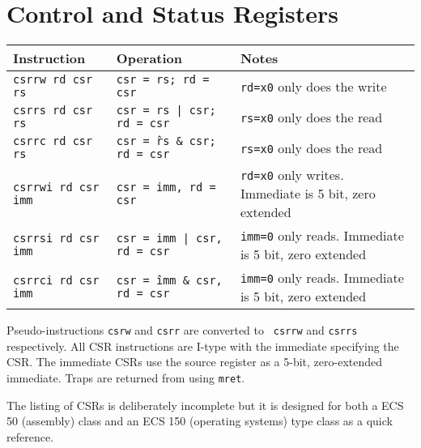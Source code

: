 \section*{Control and Status Registers}
\small
\begin{tabular}{l|l|l}
Instruction & Operation & Notes \\ \hline
{\tt csrrw rd csr rs} & {\tt csr = rs; rd = csr} & {\tt rd=x0} only does the write \\
{\tt csrrs rd csr rs} & {\tt csr = rs | csr; rd = csr} & {\tt rs=x0} only does the read \\
{\tt csrrc rd csr rs} & {\tt csr = \^rs \& csr; rd = csr} & {\tt rs=x0} only does the read \\
{\tt csrrwi rd csr imm} & {\tt csr = imm, rd = csr} & {\tt rd=x0} only writes.  Immediate is 5 bit, zero extended \\
{\tt csrrsi rd csr imm} & {\tt csr = imm | csr, rd = csr} & {\tt imm=0} only reads.  Immediate is 5 bit, zero extended \\
{\tt csrrci rd csr imm} & {\tt csr = \^imm \& csr, rd = csr} & {\tt imm=0} only reads.  Immediate is 5 bit, zero extended \\
\end{tabular}

\vspace{0.2in}
Pseudo-instructions {\tt csrw} and {\tt csrr} are converted to {\tt
  csrrw} and {\tt csrrs} respectively.  All CSR instructions are
I-type with the immediate specifying the CSR.  The immediate CSRs use
the source register as a 5-bit, zero-extended immediate.  Traps are
returned from using {\tt mret}.

The listing of CSRs is deliberately incomplete but it
is designed for both a ECS 50 (assembly) class and an ECS 150
(operating systems) type class as a quick reference.
\vspace{0.2in}

